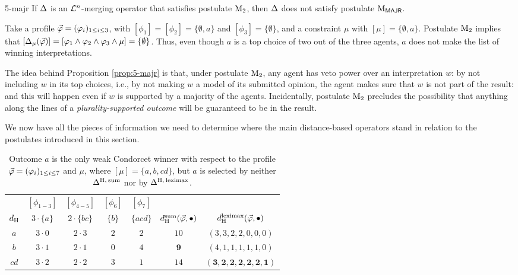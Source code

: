 \begin{prp}{}{5-majr}
	If $\me$ is an $\L^{n}$-merging operator that satisfies postulate $\ppm{2}$, 
	then $\me$ does not satisfy postulate $\ppm{\MAJR}$.
\end{prp}
\begin{prf*}{}{}%
	Take a profile $\P=(\phi_i)_{1\le i \le 3}$,
	with $[\phi_{1}]=[\phi_2]=\{\emptyset,a\}$
	and $[\phi_{3}]=\{\emptyset\}$, 
	and a constraint $\mu$ with $[\mu]=\{\emptyset,a\}$.
	Postulate $\ppm{2}$ implies that 
	$[\me_{\mu}(\P)]=[\phi_1\land\phi_2\land\phi_3\land\mu]=\{\emptyset\}$.
	Thus, even though $a$ is a top choice of two out of the three agents,
	$a$ does not make the list of winning interpretations.
\end{prf*}

The idea behind Proposition \ref{prop:5-majr} is that, under postulate $\ppm{2}$,
any agent has veto power over an interpretation $w$: by not including $w$ 
in its top choices, i.e., by not making $w$ a model of its submitted opinion, 
the agent makes sure that $w$ is not part of the result:
and this will happen even if $w$ is supported by a majority of the agents. 
Incidentally, postulate $\ppm{2}$ precludes the possibility that anything along the lines
of a \emph{plurality-supported outcome} will be guaranteed to be in the result. 

We now have all the pieces of information we need to 
determine where the main distance-based operators 
stand in relation to the postulates introduced in this section.

\begin{table}\centering
	\begin{tabular}{ccccccc}
		\toprule
						 & $[\phi_{1-3}]$ & $[\phi_{4-5}]$ & $[\phi_{6}]$ & $[\phi_{7}]$ &&\\
		$\dd_{\hamming}$ & $3\cdot\{a\}$     & $2\cdot\{bc\}$ & $\{b\}$ & $\{acd\}$ & $\dd_{\hamming}^{\ssum}(\P,\bullet)$ & $\dd_{\hamming}^{\leximax}(\P,\bullet)$\\
																 \midrule
			$a$          &     $3\cdot 0$     &   $2\cdot 3$        & $2$ & $2$ & $10$ & $(3,3,2,2,0,0,0)$   \\
			$b$          &     $3\cdot 1$     &   $2\cdot 1$        & $0$ & $4$ & $\mathbf{9}$  & $(4,1,1,1,1,1,0)$   \\
			$cd$          &    $3\cdot 2$     &   $2\cdot 2$        & $3$ & $1$ & $14$ & $\mathbf{(3,2,2,2,2,2,1)}$   \\
			\bottomrule
	\end{tabular}	
	\caption{
		Outcome $a$ is the only weak Condorcet winner 
		with respect to	the profile $\P=(\phi_i)_{1\le i \le 7}$ 
		and $\mu$, where $[\mu]=\{a,b,cd\}$,
		but $a$ is selected by neither $\me^{\hamming,\:\ssum}$
		nor by $\me^{\hamming,\:\leximax}$.
	}
	\label{tab:5-hsum-hlmax-not-condorcet}
\end{table}

